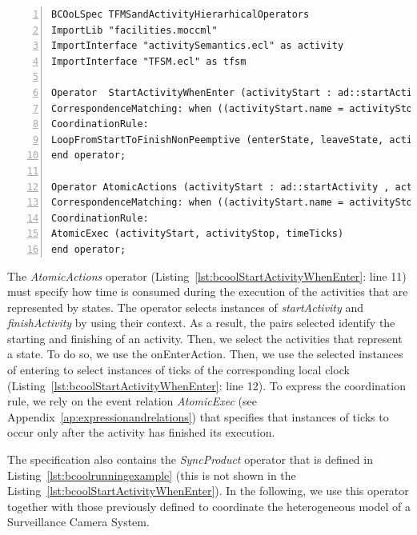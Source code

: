 \begin{lstlisting}[language=bcool,
caption={Timing and Hierarchical operator between TFSM and fUML languages},
label={lst:bcoolStartActivityWhenEnter}, 
basicstyle=\scriptsize\ttfamily, backgroundcolor=\color{LGrey}, numbers=left, xleftmargin=2pt]
BCOoLSpec TFMSandActivityHierarhicalOperators
ImportLib "facilities.moccml"
ImportInterface "activitySemantics.ecl" as activity
ImportInterface "TFSM.ecl" as tfsm

Operator  StartActivityWhenEnter (activityStart : ad::startActivity , activityStop : ad::finishActivity, enterState : tfsm::entering, leaveState : tfsm::leaving)
CorrespondenceMatching: when ((activityStart.name = activityStop.name ) and (enterState.name = leaveState.name) and (activityStart.name = enterState.onEnterAction.name));
CoordinationRule: 
LoopFromStartToFinishNonPeemptive (enterState, leaveState, activityStart, activityStop)
end operator;
		
Operator AtomicActions (activityStart : ad::startActivity , activityStop : ad::finishActivity, enterState : tfsm::entering, leaveState : tfsm::leaving, timeTicks : tfsm::ticks)
CorrespondenceMatching: when ((activityStart.name = activityStop.name ) and (activityStart.name = enterState.OnEnterAction.name ) and (enterState.owningFSM.localClock = timeTicks));
CoordinationRule: 
AtomicExec (activityStart, activityStop, timeTicks)
end operator;
\end{lstlisting}
		

The \emph{AtomicActions} operator (Listing~\ref{lst:bcoolStartActivityWhenEnter}: line 11) must specify how time is consumed during the execution of the activities that are represented by states. The operator selects instances of \dse \emph{startActivity} and \emph{finishActivity} by using their context. As a result, the pairs selected identify the starting and finishing of an activity. Then, we select the activities that represent a state. To do so, we use the onEnterAction. Then, we use the selected instances of \dse entering to select instances of \dse ticks of the corresponding local clock (Listing~\ref{lst:bcoolStartActivityWhenEnter}: line 12). To express the coordination rule, we rely on the event relation \emph{AtomicExec} (see Appendix~\ref{ap:expressionandrelations}) that specifies that instances of ticks to occur only after the activity has finished its execution.
		  
The specification also contains the \emph{SyncProduct} operator that is defined in Listing~\ref{lst:bcoolrunningexample} (this is not shown in the Listing~\ref{lst:bcoolStartActivityWhenEnter}). In the following, we use this operator together with those previously defined to coordinate the heterogeneous model of a Surveillance Camera System. 


